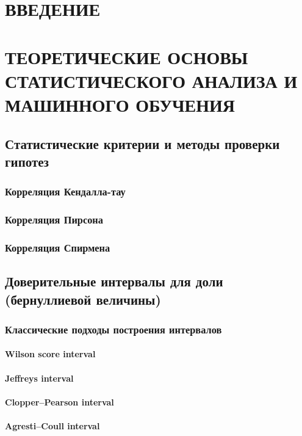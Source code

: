 \documentclass[a4paper,12pt]{article}
\begin{document}
\tableofcontents

\section*{ВВЕДЕНИЕ}

\section{ТЕОРЕТИЧЕСКИЕ ОСНОВЫ СТАТИСТИЧЕСКОГО АНАЛИЗА И МАШИННОГО ОБУЧЕНИЯ}

\subsection{Статистические критерии и методы проверки гипотез}
\subsubsection{Корреляция Кендалла-тау}
\subsubsection{Корреляция Пирсона}
\subsubsection{Корреляция Спирмена}

\subsection{Доверительные интервалы для доли (бернуллиевой величины)}
\subsubsection{Классические подходы построения интервалов}
\paragraph{Wilson score interval}
\paragraph{Jeffreys interval}
\paragraph{Clopper–Pearson interval}
\paragraph{Agresti–Coull interval}
\end{document}

